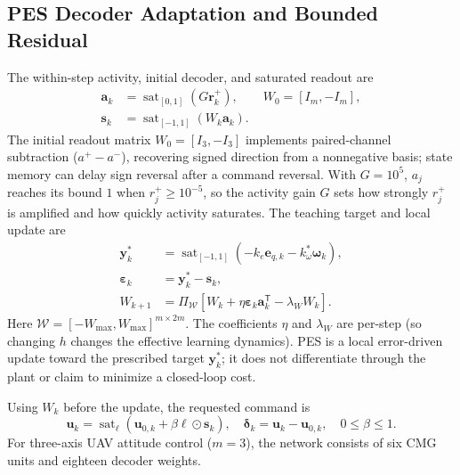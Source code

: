 \documentclass[letterpaper, 10 pt, conference]{ieeeconf}
\newcommand{\T}{^{\mathsf T}}
\newcommand{\sat}{\operatorname{sat}}
\begin{document}
\subsection{PES Decoder Adaptation and Bounded Residual}

The within-step activity, initial decoder, and saturated readout are
\begin{equation}
 \begin{aligned}
 \bm a_k&=\sat_{[0,1]}(G\bm r_k^+),\qquad W_0=[I_m,-I_m],\\
 \bm s_k&=\sat_{[-1,1]}(W_k\bm a_k).
 \end{aligned}
 \label{eq:readout}
\end{equation}
The initial readout matrix $W_0=[I_3,-I_3]$ implements paired-channel
subtraction ($a^+-a^-$), recovering signed direction from
a nonnegative basis; state memory can delay sign reversal
after a command reversal. With $G=10^5$, $a_j$ reaches its bound $1$
when $r_j^+\ge10^{-5}$, so the activity
gain $G$ sets how strongly $r_j^+$ is amplified and how quickly activity saturates. The teaching target and local update are
\begin{align}
 \bm y_k^*&=\sat_{[-1,1]}(-k_e\bm e_{q,k}-k_\omega^*\bm\omega_k),\\
 \bm\varepsilon_k&=\bm y_k^*-\bm s_k,\\
 W_{k+1}&=\Pi_{\mathcal W}
       [W_k+\eta\bm\varepsilon_k\bm a_k\T-\lambda_W W_k].
 \label{eq:pes}
\end{align}
Here $\mathcal W=[-W_{\max},W_{\max}]^{m\times2m}$. The coefficients $\eta$ and $\lambda_W$ are per-step (so changing $h$ changes the effective learning dynamics). PES is a local error-driven update toward the prescribed target $\bm y_k^*$; it does not differentiate through the plant or claim to minimize a closed-loop cost.

Using $W_k$ before the update, the requested command is
\begin{equation}
 \bm u_k=\sat_{\bm\ell}(\bm u_{0,k}+\beta\bm\ell\odot\bm s_k),\quad
 \bm\delta_k=\bm u_k-\bm u_{0,k},\quad 0\le\beta\le1.
 \label{eq:residual}
\end{equation}
For three-axis UAV attitude control ($m=3$), the network consists of
six CMG units and eighteen decoder weights.
\end{document}
